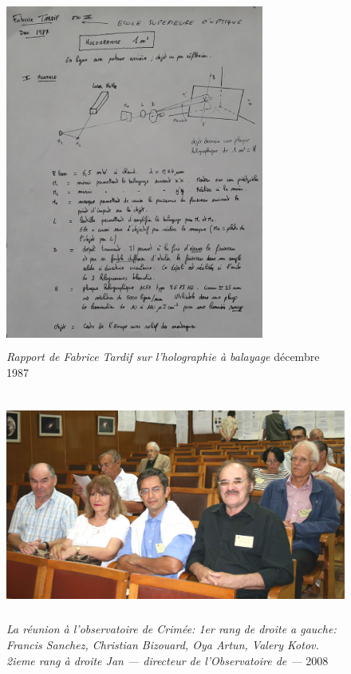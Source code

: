 \documentclass[a4paper,12pt]{article}
\begin{document}
\begin{appendix}
\begin{figure}
\centering
\includegraphics[width=8.5cm,height=11.5cm]{./figures/Tardif1987.png}
\caption[Rapport de Fabrice Tardif sur l'holographie à balayage]{\textit{Rapport de Fabrice Tardif sur l'holographie à balayage} décembre 1987}
\label{fig:18:figure18}
\end{figure}

\begin{figure}
\centering
\includegraphics[width=12.5cm,height=7.5cm]{./figures/Kotov.jpg}
\caption[Réunion à l'observatoire de Criméee]{\textit{La réunion à l'observatoire de Crimée: 1er rang de droite a gauche: Francis Sanchez, Christian Bizouard, Oya Artun, Valery Kotov. 2ieme rang à droite Jan --- directeur de l'Observatoire de ---} 2008}
\label{fig:19:figure19}
\end{figure}


\end{appendix}
\end{document}
